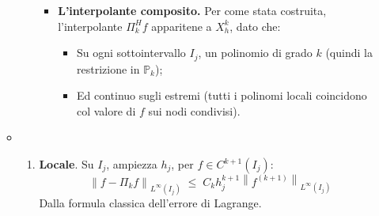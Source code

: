 \begin{itemize}
\begin{takeawaysbox}
\begin{itemize}
\begin{enumerate}
\begin{itemize}
                    \item[\textcolor{Green3}{\faIcon{question-circle}}] \textcolor{Green3}{\textbf{L'interpolante composito.}} Per come \eaccent stata costruita, l'interpolante $\Pi_{k}^{H} f$ apparitene a $X_{h}^{k}$, dato che:
                    \begin{itemize}
                        \item Su ogni sottointervallo $I_{j}$, \eaccent un polinomio di grado $k$ (quindi la restrizione \eaccent in $\mathbb{P}_{k}$);
                        \item Ed \eaccent continuo sugli estremi (tutti i polinomi locali coincidono col valore di $f$ sui nodi condivisi).
                    \end{itemize}
                \end{itemize}
            \end{enumerate}

            \item {}
            \begin{enumerate}
                \item \textbf{Locale}. Su $I_{j}$, ampiezza $h_{j}$, per $f \in C^{k+1}\left(I_{j}\right)$:
                \begin{equation*}
                    \left\| f - \Pi_{k} f \right\|_{L^{\infty}\left(I_{j}\right)} \; \le \; C_{k} h_{j}^{k+1} \left\| f^{\left(k+1\right)} \right\|_{L^{\infty}\left(I_{j}\right)}
                \end{equation*}
                Dalla formula classica dell'errore di Lagrange.


\end{enumerate}
\end{itemize}
\end{takeawaysbox}
\end{itemize}

